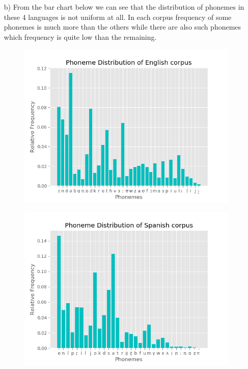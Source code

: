 \documentclass{article}
\begin{document}
\begin{itemize}
	\item[b)]
	    From the bar chart below we can see that the distribution of phonemes in these 4 languages is not uniform at all. In each corpus frequency of some phonemes is much more than the others while there are also such phonemes which frequency is quite low than the remaining.  
		\begin{figure}[H]
            \centering
                \begin{minipage}{.55\textwidth}
                    \centering
                    \includegraphics[keepaspectratio=true,scale=0.35]{English.png} 
                    \label{fig:prob1_6_2}
                \end{minipage}%
                \begin{minipage}{.5\textwidth}
                    \centering
                    \includegraphics[keepaspectratio=true,scale=0.35]{Spanish.png}   

\end{minipage}
\end{figure}
\end{itemize}
\end{document}
